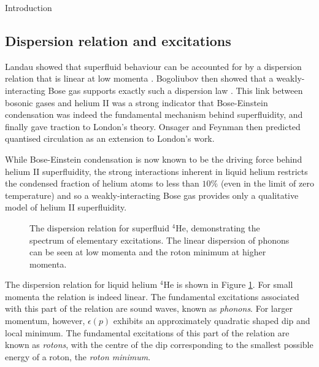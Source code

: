 \begin{chapter}{\label{cha:bose_gases}Introduction}
\subsection{Dispersion relation and excitations}
Landau showed that superfluid behaviour can be accounted for by a dispersion relation that is linear at low momenta \cite{Landau41}. Bogoliubov then showed that a weakly-interacting Bose gas supports exactly such a dispersion law \cite{bogo47}. This link between bosonic gases and helium II was a strong indicator that Bose-Einstein condensation was indeed the fundamental mechanism behind superfluidity, and finally gave traction to London's theory. Onsager \cite{Onsager49} and Feynman \cite{Feynman55} then predicted quantised circulation as an extension to London's work.

While Bose-Einstein condensation is now known to be the driving force behind helium II superfluidity, the strong interactions inherent in liquid helium restricts the condensed fraction of helium atoms to less than $10\%$ \cite{Donnelly} (even in the limit of zero temperature) and so a weakly-interacting Bose gas provides only a qualitative model of helium II superfluidity.

\begin{figure}
	\centering
	\caption{\label{fig:hedisp}The dispersion relation for superfluid $^4$He, demonstrating the spectrum of elementary excitations. The linear dispersion of phonons can be seen at low momenta and the roton minimum at higher momenta.}
\end{figure}

The dispersion relation for liquid helium $^4$He is shown in Figure \ref{fig:hedisp}. For small momenta the relation is indeed linear. The fundamental excitations associated with this part of the relation are sound waves, known as {\it phonons}. For larger momentum, however, $\epsilon(p)$ exhibits an approximately quadratic shaped dip and local minimum. The fundamental excitations of this part of the relation are known as {\it rotons}, with the centre of the dip corresponding to the smallest possible energy of a roton, the {\it roton minimum}. 


\end{chapter}

